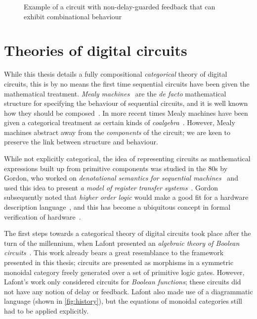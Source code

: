 \begin{figure}
    \centering
    \caption{
        Example of a circuit with non-delay-guarded feedback that can
        exhibit combinational behaviour~\cite{malik1994analysis}
    }
    \label{fig:cyclic}
\end{figure}

\section{Theories of digital circuits}

While this thesis details a fully compositional
\emph{categorical} theory of digital circuits, this is by no means the first
time sequential circuits have been given the mathematical treatment.
\emph{Mealy machines}~\cite{mealy1955method} are the
\emph{de facto} mathematical structure for specifying the behaviour of
sequential circuits, and it is well
known how they should be composed~\cite{ginzburg2014algebraic}.
In more recent times Mealy machines have been given a categorical treatment as
certain kinds of \emph{coalgebra}~\cite{rutten2006algebraic,bonsangue2008coalgebraic}.
However, Mealy machines abstract away from the \emph{components} of the circuit;
we are keen to preserve the link between structure and behaviour.

While not explicitly categorical, the idea of representing circuits as
mathematical expressions built up from primitive components was studied in the
80s by Gordon, who worked on
\emph{denotational semantics for sequential machines}~\cite{gordon1980denotational}
and used this idea to present
\emph{a model of register transfer systems}~\cite{gordon1982model}.
Gordon subsequently noted that \emph{higher order logic} would make a good fit
for a hardware description language~\cite{gordon1985why}, and this has become
a ubiquitous concept in formal verification of hardware~\cite{gupta1992formal}.

The first steps towards a categorical theory of digital circuits took place
after the turn of the millennium, when Lafont presented an
\emph{algebraic theory of Boolean circuits}~\cite{lafont2003algebraic}.
This work already bears a great resemblance to the framework presented in this
thesis; circuits are presented as morphisms in a symmetric monoidal category
freely generated over a set of primitive logic gates.
However, Lafont's work only considered circuits for \emph{Boolean functions};
these circuits did not have any notion of delay or feedback.
Lafont also made use of a diagrammatic language (shown in \cref{fig:history}),
but the equations of monoidal categories still had to be applied explicitly.

